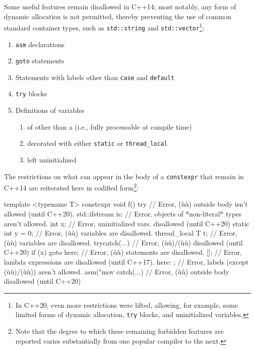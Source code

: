 \noindent Some useful features remain disallowed in C++14; most notably, any form
of dynamic allocation is not permitted, thereby preventing the use of
common standard container types, such as \lstinline!std::string! and
\lstinline!std::vector!{\cprotect\footnote{In C++20, even more
restrictions were lifted, allowing, for example, some limited forms of
  dynamic allocation, \lstinline!try! blocks, and uninitialized variables.}}:
\begin{enumerate}
\item{\lstinline!asm! declarations}
\item{\lstinline!goto! statements}
\item{Statements with labels other than \lstinline!case! and \lstinline!default!}
\item{\lstinline!try! blocks}
\item{Definitions of variables
\begin{enumerate}
\item{of other than a  (i.e., fully processable at compile time)}
\item{decorated with either \lstinline!static! or \lstinline!thread_local!}
\item{left uninitialized}
\end{enumerate}
}
\end{enumerate}
The restrictions on what can appear in the body of a \lstinline!constexpr!
that remain in C++14 are reiterated here in codified
form\footnote{Note that the degree to which these remaining forbidden features are reported varies substantially from one popular compiler to the next.}:

\begin{emcppslisting}[emcppsstandards={c++14}]
template <typename T>
constexpr void f()
{
try {                  // Error, (ù{}ù) outside body isn't allowed (until C++20).
    std::ifstream is;  // Error, objects of *non-literal* types aren't allowed.
    int x;             // Error, uninitialized vars. disallowed (until C++20)
    static int y = 0;  // Error, (ù{}ù) variables are disallowed.
    thread_local T t;  // Error, (ù{}ù) variables are disallowed.
    try{}catch(...){}  // Error, (ù{}ù)/(ù{}ù) disallowed (until C++20)
    if (x) goto here;  // Error, (ù{}ù) statements are disallowed.
    []{};              // Error, lambda expressions are disallowed (until C++17).
here: ;                // Error, labels (except (ù{}ù)/(ù{}ù)) aren't allowed.
    asm("mov %
} catch(...) { }       // Error, (ù{}ù) outside body disallowed (until C++20)
}
\end{emcppslisting}


